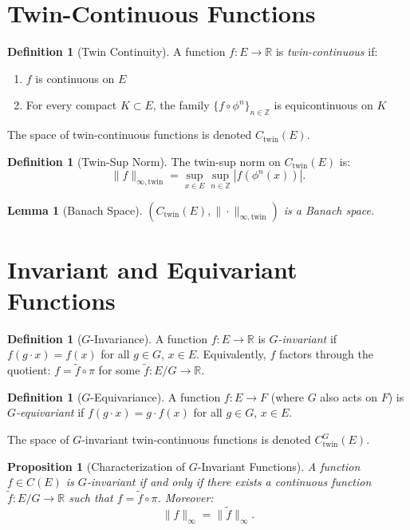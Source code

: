 \documentclass[11pt,twoside,openright]{book}
\theoremstyle{plain}
\newtheorem{lemma}[theorem]{Lemma}
\newtheorem{proposition}[theorem]{Proposition}
\theoremstyle{definition}
\newtheorem{definition}[theorem]{Definition}
\theoremstyle{remark}
\newcommand{\Rd}{\mathbb{R}}
\newcommand{\Zd}{\mathbb{Z}}
\newcommand{\norm}[1]{\|#1\|}
\begin{document}
\section{Twin-Continuous Functions}

\begin{definition}[Twin Continuity]
A function $f : E \to \Rd$ is \emph{twin-continuous} if:
\begin{enumerate}[label=(\roman*)]
\item $f$ is continuous on $E$
\item For every compact $K \subset E$, the family $\{f \circ \phi^n\}_{n \in \Zd}$ is equicontinuous on $K$
\end{enumerate}
The space of twin-continuous functions is denoted $C_{\text{twin}}(E)$.
\end{definition}

\begin{definition}[Twin-Sup Norm]
The twin-sup norm on $C_{\text{twin}}(E)$ is:
\[
\norm{f}_{\infty, \text{twin}} = \sup_{x \in E} \sup_{n \in \Zd} |f(\phi^n(x))|.
\]
\end{definition}

\begin{lemma}[Banach Space]
$(C_{\text{twin}}(E), \norm{\cdot}_{\infty, \text{twin}})$ is a Banach space.
\end{lemma}

\section{Invariant and Equivariant Functions}

\begin{definition}[$G$-Invariance]
A function $f : E \to \Rd$ is \emph{$G$-invariant} if $f(g \cdot x) = f(x)$ for all $g \in G$, $x \in E$. Equivalently, $f$ factors through the quotient: $f = \tilde{f} \circ \pi$ for some $\tilde{f} : E/G \to \Rd$.
\end{definition}

\begin{definition}[$G$-Equivariance]
A function $f : E \to F$ (where $G$ also acts on $F$) is \emph{$G$-equivariant} if $f(g \cdot x) = g \cdot f(x)$ for all $g \in G$, $x \in E$.
\end{definition}

The space of $G$-invariant twin-continuous functions is denoted $C_{\text{twin}}^G(E)$.

\begin{proposition}[Characterization of $G$-Invariant Functions]
A function $f \in C(E)$ is $G$-invariant if and only if there exists a continuous function $\tilde{f} : E/G \to \Rd$ such that $f = \tilde{f} \circ \pi$. Moreover:
\[
\norm{f}_\infty = \norm{\tilde{f}}_\infty.
\]
\end{proposition}
\end{document}
